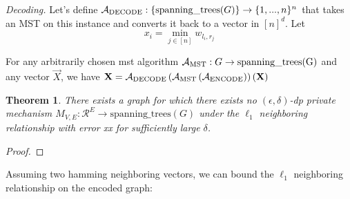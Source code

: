 \documentclass{article}
\newtheorem{theorem}{Theorem}[section]
\newtheorem{lemma}[theorem]{Lemma}
\begin{document}
\noindent\textit{Decoding.} Let's define ${\mathcal{A}_{\mathrm{DECODE}}:\{\mathrm{spanning\_trees}(G)}\} \rightarrow \{1, ..., n\}^n$ that takes an MST on this instance and converts it back to a vector in $[n]^d$.
Let 
\[
x_i = \min\limits_{j \in [n]}{w_{l_i,r_j}}
\]

For any arbitrarily chosen mst algorithm $\mathcal{A}_{\mathrm{MST}}:G \rightarrow \mathrm{spanning\_trees(G)}$ and any vector $\vec{X}$, we have $\mathbf{X} = \mathcal{A}_{\mathrm{DECODE}}\left(\mathcal{A}_{\mathrm{MST}}\left(\mathcal{A}_{\mathrm{ENCODE}}\right)\right)(\mathbf{X})$


\begin{theorem}
There exists a graph for which there exists no $(\epsilon, \delta)$-dp private mechanism $M_{V,E}:\mathcal{R}^E \rightarrow \mathrm{spanning\_trees}(G)$ under the $\ell_1$ neighboring relationship with error xx for sufficiently large $\delta$.
\end{theorem}
\begin{proof}
\end{proof}

Assuming two hamming neighboring vectors, we can bound the $\ell_1$ neighboring relationship on the encoded graph:
\end{document}
